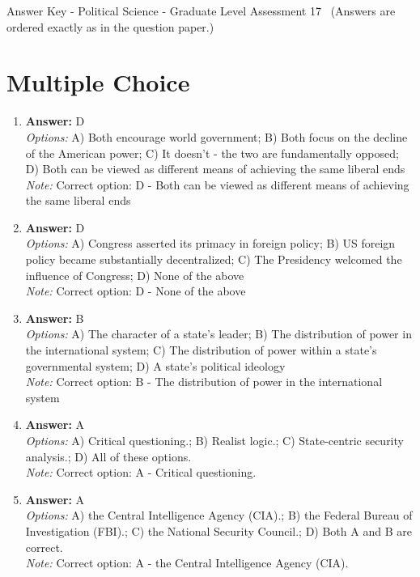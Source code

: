 \documentclass[12pt]{article}
\begin{document}
\begin{center}
Answer Key - Political Science - Graduate Level Assessment 17 \
\small (Answers are ordered exactly as in the question paper.)
\end{center}

\section*{Multiple Choice}
\begin{enumerate}[label=\arabic*.]
\item \textbf{Answer:} D
\\ \textit{Options:} A) Both encourage world government; B) Both focus on the decline of the American power; C) It doesn't - the two are fundamentally opposed; D) Both can be viewed as different means of achieving the same liberal ends
\\ \textit{Note:} Correct option: D - Both can be viewed as different means of achieving the same liberal ends
\item \textbf{Answer:} D
\\ \textit{Options:} A) Congress asserted its primacy in foreign policy; B) US foreign policy became substantially decentralized; C) The Presidency welcomed the influence of Congress; D) None of the above
\\ \textit{Note:} Correct option: D - None of the above
\item \textbf{Answer:} B
\\ \textit{Options:} A) The character of a state's leader; B) The distribution of power in the international system; C) The distribution of power within a state's governmental system; D) A state's political ideology
\\ \textit{Note:} Correct option: B - The distribution of power in the international system
\item \textbf{Answer:} A
\\ \textit{Options:} A) Critical questioning.; B) Realist logic.; C) State-centric security analysis.; D) All of these options.
\\ \textit{Note:} Correct option: A - Critical questioning.
\item \textbf{Answer:} A
\\ \textit{Options:} A) the Central Intelligence Agency (CIA).; B) the Federal Bureau of Investigation (FBI).; C) the National Security Council.; D) Both A and B are correct.
\\ \textit{Note:} Correct option: A - the Central Intelligence Agency (CIA).
\end{enumerate}
\end{document}

